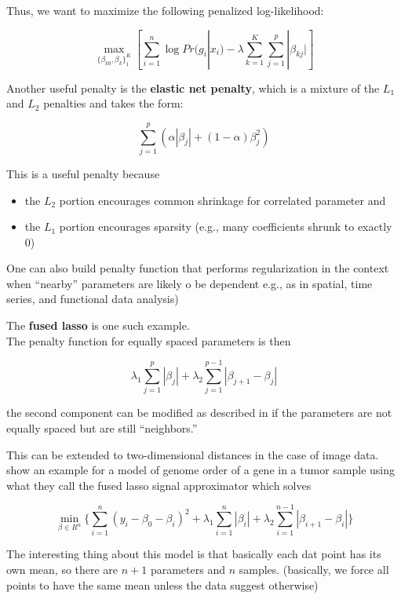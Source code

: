 \documentclass[
]{book}
\begin{document}
Thus, we want to maximize the following penalized log-likelihood:

\[
\underset{\{\beta_{k0}, \beta_k\}_1^K}{\operatorname{max}} [\sum_{i=1}^n \log Pr (g_i |x_i) - \lambda \sum_{k=1}^K \sum_{j=1}^p | \beta_{kj}|]
\]

Another useful penalty is the \textbf{elastic net penalty}, which is a mixture of the \(L_1\) and \(L_2\) penalties and takes the form:

\[
\sum_{j=1}^p (\alpha|\beta_j| + (1- \alpha) \beta_j^2)
\]

This is a useful penalty because

\begin{itemize}
\item
  the \(L_2\) portion encourages common shrinkage for correlated parameter and
\item
  the \(L_1\) portion encourages sparsity (e.g., many coefficients shrunk to exactly 0)
\end{itemize}

One can also build penalty function that performs regularization in the context when ``nearby'' parameters are likely o be dependent e.g., as in spatial, time series, and functional data analysis)

The \textbf{fused lasso} is one such example.\\
The penalty function for equally spaced parameters is then

\[
\lambda_1 \sum_{j=1}^p |\beta_j| + \lambda_2 \sum_{j=1}^{p-1}|\beta_{j+1}- \beta_j|
\]

the second component can be modified as described in \citep[ 18.4.2]{hastie2001a} if the parameters are not equally spaced but are still ``neighbors.''

This can be extended to two-dimensional distances in the case of image data. \citep[ 18.4.2]{hastie2001a} show an example for a model of genome order of a gene in a tumor sample using what they call the fused lasso signal approximator which solves

\[
\underset{\beta \in R^n}{\operatorname{min}} \{ \sum_{i=1}^n (y_i - \beta_0 - \beta_i)^2 + \lambda_1 \sum_{i=1}^n |\beta_i| + \lambda_2 \sum_{i=1}^{n-1} |\beta_{i+1} - \beta_i| \}
\]

The interesting thing about this model is that basically each dat point has its own mean, so there are \(n+1\) parameters and \(n\) samples. \citep[ 18.8]{hastie2001a} (basically, we force all points to have the same mean unless the data suggest otherwise)
\end{document}
